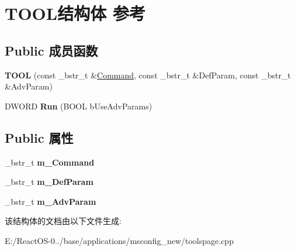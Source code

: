 \hypertarget{struct_t_o_o_l}{}\section{T\+O\+O\+L结构体 参考}
\label{struct_t_o_o_l}
\subsection*{Public 成员函数}
\begin{DoxyCompactItemize}
\item 
\mbox{\label{struct_t_o_o_l_abb3b2fbf3eb003a1f9cda4c475341944}} 
{\bfseries T\+O\+OL} (const \+\_\+bstr\+\_\+t \&\hyperlink{struct_command}{Command}, const \+\_\+bstr\+\_\+t \&Def\+Param, const \+\_\+bstr\+\_\+t \&Adv\+Param)
\item 
\mbox{\label{struct_t_o_o_l_aa146ae7f6e9a8720a08833770ed9481d}} 
D\+W\+O\+RD {\bfseries Run} (B\+O\+OL b\+Use\+Adv\+Params)
\end{DoxyCompactItemize}
\subsection*{Public 属性}
\begin{DoxyCompactItemize}
\item 
\mbox{\label{struct_t_o_o_l_a046f27edece0bd3f8e07b91cf7bbb76b}} 
\+\_\+bstr\+\_\+t {\bfseries m\+\_\+\+Command}
\item 
\mbox{\label{struct_t_o_o_l_a169e3fce9cb110eea1e7a45f8bc0dc35}} 
\+\_\+bstr\+\_\+t {\bfseries m\+\_\+\+Def\+Param}
\item 
\mbox{\label{struct_t_o_o_l_ab636c79a1e9a370c9b40c23a5bcdfda8}} 
\+\_\+bstr\+\_\+t {\bfseries m\+\_\+\+Adv\+Param}
\end{DoxyCompactItemize}


该结构体的文档由以下文件生成\+:\begin{DoxyCompactItemize}
\item 
E\+:/\+React\+O\+S-\/0../base/applications/msconfig\+\_\+new/toolspage.\+cpp\end{DoxyCompactItemize}
